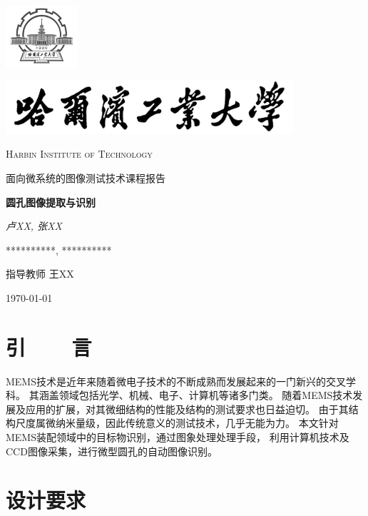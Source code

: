 \documentclass[12pt,a4paper]{report}
\begin{document}
\begin{titlepage}
    \centering
    \includegraphics[width=0.2\textwidth]{sf1.png}\par
    \vspace{1cm}
    \includegraphics[width=0.8\textwidth]{sf.jpg}\par
    \vspace{0.1cm}
    {\scshape\LARGE Harbin Institute of Technology \par}
    \vspace{1cm}
    {\kaishu\LARGE 面向微系统的图像测试技术课程报告\par}
    \vspace{1.5cm}
    {\huge\bfseries 圆孔图像提取与识别\par}
    \vspace{2cm}
    {\fangsong\Large\itshape 卢XX, 张XX\par}
    \vfill
    {**********, **********}\par

    \vfill
    指导教师	\textsc{王XX}
    \vfill
    {\large \today\par}
\end{titlepage}

\section{引~~~~言}

MEMS技术是近年来随着微电子技术的不断成熟而发展起来的一门新兴的交叉学科。 
其涵盖领域包括光学、机械、电子、计算机等诸多门类。 
随着MEMS技术发展及应用的扩展，对其微细结构的性能及结构的测试要求也日益迫切。 
由于其结构尺度属微纳米量级，因此传统意义的测试技术，几乎无能为力。 
本文针对MEMS装配领域中的目标物识别，通过图象处理处理手段，
利用计算机技术及CCD图像采集，进行微型圆孔的自动图像识别。

\section{设计要求}
\end{document}
